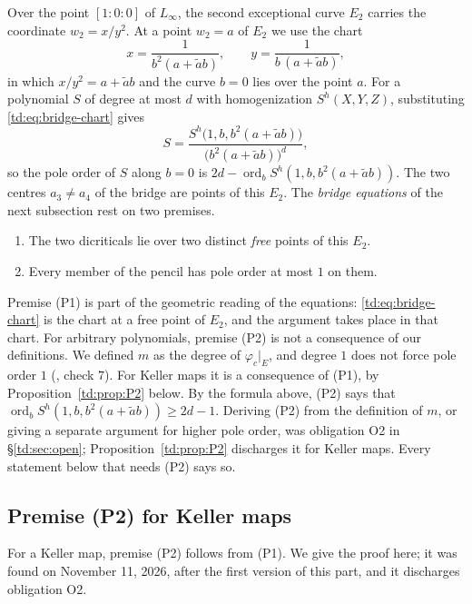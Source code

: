\documentclass[a4paper,11pt]{article}
\newcommand{\filename}[1]{\texttt{\seqsplit{#1}}}
\theoremstyle{jsplain}
\theoremstyle{jsdef}
\theoremstyle{jsrem}
\begin{document}
Over the point $[1:0:0]$ of $L_\infty$, the second exceptional curve $E_2$ carries the
coordinate $w_2 = x/y^2$. At a point $w_2 = a$ of $E_2$ we use the chart
\begin{equation}\label{td:eq:bridge-chart}
x = \frac{1}{b^2 (a + \tilde{a} b)}, \qquad y = \frac{1}{b\,(a + \tilde{a} b)},
\end{equation}
in which $x/y^2 = a + \tilde{a} b$ and the curve $b = 0$ lies over the point $a$. For a polynomial
$S$ of degree at most $d$ with homogenization $S^h(X,Y,Z)$, substituting \eqref{td:eq:bridge-chart}
gives
\[
S = \frac{S^h\big(1, b, b^2(a + \tilde{a} b)\big)}{\big(b^2(a + \tilde{a} b)\big)^{d}},
\]
so the pole order of $S$ along $b = 0$ is $2d - \operatorname{ord}_b S^h(1, b, b^2(a+\tilde a b))$.
The two centres $a_3 \neq a_4$ of the bridge are points of this $E_2$. The \emph{bridge equations}
of the next subsection rest on two premises.
\begin{enumerate}[label=(P\arabic*),leftmargin=*]
\item The two dicriticals lie over two distinct \emph{free} points of this $E_2$.
\item Every member of the pencil has pole order at most $1$ on them.
\end{enumerate}
Premise (P1) is part of the geometric reading of the equations: \eqref{td:eq:bridge-chart} is the
chart at a free point of $E_2$, and the argument takes place in that chart. For arbitrary
polynomials, premise (P2) is not a consequence of our definitions. We defined $m$ as
the degree of $\varphi_c|_E$, and degree $1$ does not force pole order $1$
(\filename{lean/check\_satellite.py}, check $7$). For Keller maps it is a consequence of (P1), by
Proposition~\ref{td:prop:P2} below. By the formula above, (P2) says that
$\operatorname{ord}_b S^h(1,b,b^2(a+\tilde a b)) \geq 2d - 1$. Deriving (P2) from the definition of
$m$, or giving a separate argument for higher pole order, was obligation O2 in
\S\ref{td:sec:open}; Proposition~\ref{td:prop:P2} discharges it for Keller maps. Every statement
below that needs (P2) says so.

\subsection{Premise (P2) for Keller maps}\label{td:sec:P2}

For a Keller map, premise (P2) follows from (P1). We give the proof here; it was found on
November 11, 2026, after the first version of this part, and it discharges obligation O2.
\end{document}
